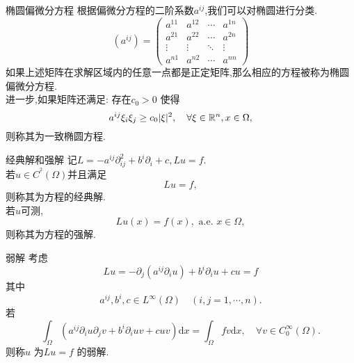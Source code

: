 \begin{frame}[t]{椭圆偏微分方程}
  根据偏微分方程的二阶系数$a^{ij}$,我们可以对椭圆进行分类.
  \[
    (a^{ij})=\begin{pmatrix} a^{11} & a^{12} &\cdots &a^{1n}\\
      a^{21} & a^{22} & \cdots & a^{2n}\\
      \vdots & \vdots & \ddots & \vdots\\
      a^{n1} & a^{n2} &\cdots & a^{nn}
    \end{pmatrix} 
  \] 
如果上述矩阵在求解区域内的任意一点都是正定矩阵,那么相应的方程被称为椭圆偏微分方程.\\
进一步,如果矩阵还满足: 存在$c_0>0$ 使得
\[
a^{ij}\xi_i\xi_j\ge c_0|\xi|^2,\quad \forall \xi \in \mathbb{R}^{n},x \in \Omega,
\] 
则称其为一致椭圆方程.
\end{frame}
\begin{frame}[t]{经典解和强解}
  记$L=-a^{ij}\partial^2_{ij}+b^i\partial_i+c,Lu=f$.\\
    若$u\in C^{^2}(\Omega) $并且满足
    \[
      Lu=f,
    \]则称其为方程的经典解.\\
    若$u$可测, \[
    L u(x)=f(x), \text{ a.e. }x\in \Omega, \]则称其为方程的强解.
 \end{frame}
 \begin{frame}{弱解}
    考虑
    \[
    Lu=-\partial_j\left( a^{ij}\partial_i u \right)+b^i \partial_i u +cu=f
    \]
    其中
    \[
      a^{ij},b^i,c \in L^{\infty}(\Omega)\quad \left( i,j=1,\cdots,n \right) .
    \] 
    若
\[
  \int_{\Omega}(a^{ij}\partial_i u \partial_j v +b^i \partial_i u v+cuv)\mathrm{d}x = \int_{\Omega} fv \mathrm{d}x, \quad \forall v \in C_0^{\infty}(\Omega).
\]
则称$u$ 为$Lu=f$ 的弱解.
\end{frame}
